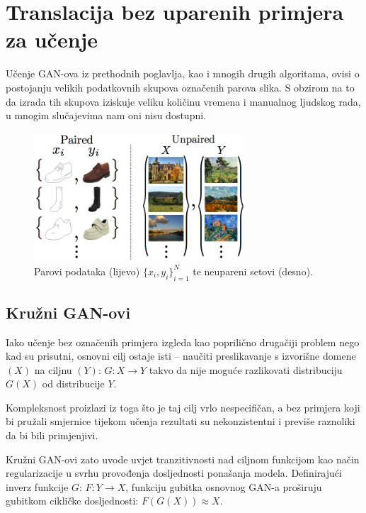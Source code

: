 \documentclass[lmodern, utf8, seminar]{fer}
\begin{document}


\chapter{Translacija bez uparenih primjera za učenje}
Učenje GAN-ova iz prethodnih poglavlja, kao i mnogih drugih algoritama, ovisi o postojanju velikih podatkovnih skupova označenih parova slika. S obzirom na to da izrada tih skupova iziskuje veliku količinu vremena i manualnog ljudskog rada, u mnogim slučajevima nam oni nisu dostupni.

\begin{figure}[H]
    \centering
    \includegraphics[width=0.7\textwidth]{zhu2017unpaired-paired-vs-unpaired}
    \caption{Parovi podataka (lijevo) ${\{x_i,y_i\}}_{i=1}^N$ te neupareni setovi (desno). }
    \label{fig:zhu2017unpaired-paired-vs-unpaired}
\end{figure}

\newpage
\section{Kružni GAN-ovi}
Iako učenje bez označenih primjera izgleda kao poprilično drugačiji problem nego kad su prisutni, osnovni cilj ostaje isti -- naučiti preslikavanje s izvorišne domene $(X)$ na ciljnu $(Y)$: $G: X\rightarrow Y$ takvo da nije moguće razlikovati distribuciju $G(X)$ od distribucije $Y$. 

Kompleksnost proizlazi iz toga što je taj cilj vrlo nespecifičan, a bez primjera koji bi pružali smjernice tijekom učenja rezultati su nekonzistentni i previše raznoliki da bi bili primjenjivi.

Kružni GAN-ovi zato uvode uvjet tranzitivnosti nad ciljnom funkcijom kao način regularizacije u svrhu provođenja dosljednosti ponašanja modela.
Definirajući inverz funkcije $G$: $F: Y \rightarrow X$, funkciju gubitka osnovnog GAN-a proširuju gubitkom cikličke dosljednosti: $F(G(X)) \approx X$.
\end{document}

